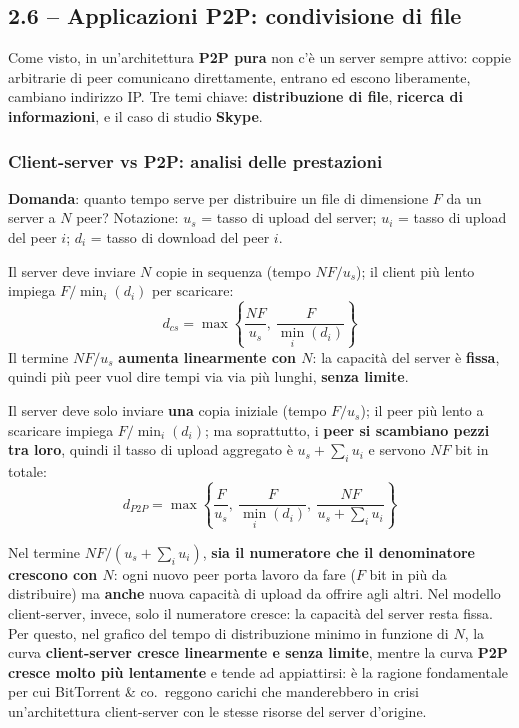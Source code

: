 \documentclass[12pt, a4paper]{article}
\begin{document}
\subsection{2.6 -- Applicazioni P2P: condivisione di file}

Come visto, in un'architettura \textbf{P2P pura} non c'è un server sempre attivo: coppie arbitrarie di peer comunicano direttamente, entrano ed escono liberamente, cambiano indirizzo IP. Tre temi chiave: \textbf{distribuzione di file}, \textbf{ricerca di informazioni}, e il caso di studio \textbf{Skype}.

\subsubsection{Client-server vs P2P: analisi delle prestazioni}

\textbf{Domanda}: quanto tempo serve per distribuire un file di dimensione $F$ da un server a $N$ peer? Notazione: $u_s$ = tasso di upload del server; $u_i$ = tasso di upload del peer $i$; $d_i$ = tasso di download del peer $i$.

\begin{tcolorbox}[colback=lightergray!10, colframe=tocsec, title=\textbf{Modello client-server}]
Il server deve inviare $N$ copie in sequenza (tempo $NF/u_s$); il client più lento impiega $F/\min_i(d_i)$ per scaricare:
$$d_{cs} = \max\left\{\frac{NF}{u_s},\ \frac{F}{\min_i(d_i)}\right\}$$
Il termine $NF/u_s$ \textbf{aumenta linearmente con $N$}: la capacità del server è \textbf{fissa}, quindi più peer vuol dire tempi via via più lunghi, \textbf{senza limite}.
\end{tcolorbox}

\begin{tcolorbox}[colback=lightergray!10, colframe=tocsec, title=\textbf{Modello P2P}]
Il server deve solo inviare \textbf{una} copia iniziale (tempo $F/u_s$); il peer più lento a scaricare impiega $F/\min_i(d_i)$; ma soprattutto, i \textbf{peer si scambiano pezzi tra loro}, quindi il tasso di upload aggregato è $u_s + \sum_i u_i$ e servono $NF$ bit in totale:
$$d_{P2P} = \max\left\{\frac{F}{u_s},\ \frac{F}{\min_i(d_i)},\ \frac{NF}{u_s + \sum_i u_i}\right\}$$
\end{tcolorbox}

\begin{tcolorbox}[colback=cyan!5, colframe=blue!40!black, title=\textbf{Perché il P2P scala meglio -- l'intuizione chiave}]
Nel termine $NF/(u_s+\sum_i u_i)$, \textbf{sia il numeratore che il denominatore crescono con $N$}: ogni nuovo peer porta lavoro da fare ($F$ bit in più da distribuire) ma \textbf{anche} nuova capacità di upload da offrire agli altri. Nel modello client-server, invece, solo il numeratore cresce: la capacità del server resta fissa. Per questo, nel grafico del tempo di distribuzione minimo in funzione di $N$, la curva \textbf{client-server cresce linearmente e senza limite}, mentre la curva \textbf{P2P cresce molto più lentamente} e tende ad appiattirsi: è la ragione fondamentale per cui BitTorrent \& co.\ reggono carichi che manderebbero in crisi un'architettura client-server con le stesse risorse del server d'origine.
\end{tcolorbox}
\end{document}
